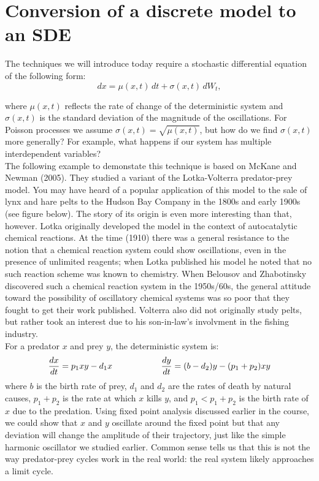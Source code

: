 \documentclass{article}
\begin{document}
\large

\section*{Conversion of a discrete model to an SDE}

The techniques we will introduce today require a stochastic differential equation of the following form:
\[ dx = \mu(x,t) \, dt + \sigma(x,t) \, dW_t, \]

where $\mu(x,t)$ reflects the rate of change of the deterministic system and $\sigma(x,t)$ is the standard deviation of the magnitude of the oscillations. For Poisson processes we assume $\sigma(x,t)=\sqrt{\mu(x,t)}$, but how do we find $\sigma(x,t)$ more generally? For example, what happens if our system has multiple interdependent variables?\\

The following example to demonstate this technique is based on McKane and Newman (2005). They studied a variant of the Lotka-Volterra predator-prey model. You may have heard of a popular application of this model to the sale of lynx and hare pelts to the Hudson Bay Company in the 1800s and early 1900s (see figure below). The story of its origin is even more interesting than that, however. Lotka originally developed the model in the context of autocatalytic chemical reactions. At the time (1910) there was a general resistance to the notion that a chemical reaction system could show oscillations, even in the presence of unlimited reagents; when Lotka published his model he noted that no such reaction scheme was known to chemistry. When Belousov and Zhabotinsky discovered such a chemical reaction system in the 1950s/60s, the general attitude toward the possibility of oscillatory chemical systems was so poor that they fought to get their work published. Volterra also did not originally study pelts, but rather took an interest due to his son-in-law's involvment in the fishing industry.\\

For a predator $x$ and prey $y$, the deterministic system is:
\[ \frac{dx}{dt} = p_1 x y - d_1 x \hspace{2 cm} \frac{dy}{dt} = (b - d_2) y - (p_1+p_2) x y \]
where $b$ is the birth rate of prey, $d_1$ and $d_2$ are the rates of death by natural causes, $p_1+p_2$ is the rate at which $x$ kills $y$, and $p_1< p_1 + p_2$ is the birth rate of $x$ due to the predation. Using fixed point analysis discussed earlier in the course, we could show that $x$ and $y$ oscillate around the fixed point but that any deviation will change the amplitude of their trajectory, just like the simple harmonic oscillator we studied earlier. Common sense tells us that this is not the way predator-prey cycles work in the real world: the real system likely approaches a limit cycle.\\
\end{document}
